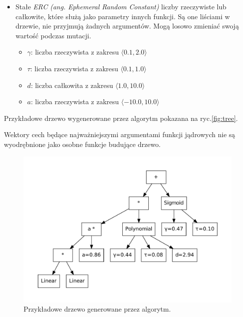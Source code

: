 \begin{itemize}
\item Stałe \textit{ERC (ang. Ephemeral Random Constant)} liczby rzeczywiste lub całkowite, które służą jako parametry innych funkcji. Są one liściami w drzewie, nie przyjmują żadnych argumentów. Mogą losowo zmieniać swoją wartość podczas mutacji.
	\begin{itemize}
	\item $ \gamma $: liczba rzeczywista z zakresu $ \langle 0.1, 2.0 \rangle $
	\item $ \tau $: liczba rzeczywista z zakresu $ \langle 0.1, 1.0 \rangle $
	\item $ d $: liczba całkowita z zakresu $ \langle 1.0, 10.0 \rangle $
	\item $ a $: liczba rzeczywista z zakresu $ \langle -10.0, 10.0 \rangle $
	\end{itemize}
\end{itemize}
Przykładowe drzewo wygenerowane przez algorytm pokazana na ryc.\ref{fig:tree}.

Wektory cech będące najważniejszymi argumentami funkcji jądrowych nie są wyodrębnione jako osobne funkcje budujące drzewo.

\begin{figure}[h]
\centering
\includegraphics[scale=0.6]{figures/graphs/3-tree}
\caption{Przykładowe drzewo generowane przez algorytm.\label{fig:3-tree}}
\end{figure}


